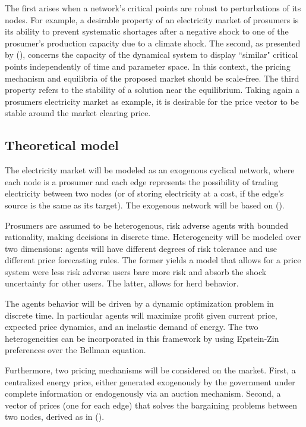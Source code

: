 \documentclass[american]{scrartcl}
\begin{document}
The first arises when a network's critical points are robust to perturbations of its nodes. For example, a desirable property of an electricity market of prosumers is its ability to prevent systematic shortages after a negative shock to one of the prosumer's production capacity due to a climate shock. The second, as presented by \citeauthor{Bak1995} (\citeyear{Bak1995}), concerns the capacity of the dynamical system to display ``similar" critical points independently of time and parameter space. In this context, the pricing mechanism and equilibria of the proposed market should be scale-free. The third property refers to the stability of a solution near the equilibrium. Taking again a prosumers electricity market as example, it is desirable for the price vector to be stable around the market clearing price.

\subsection{Theoretical model}

The electricity market will be modeled as an exogenous cyclical network, where each node is a prosumer and each edge represents the possibility of trading electricity between two nodes (or of storing electricity at a cost, if the edge's source is the same as its target). The exogenous network will be based on \citeauthor{Brown2019} (\citeyear{Brown2019}).

Prosumers are assumed to be heterogenous, risk adverse agents with bounded rationality, making decisions in discrete time. Heterogeneity will be modeled over two dimensions: agents will have different degrees of risk tolerance and use different price forecasting rules. The former yields a model that allows for a price system were less risk adverse users bare more risk and absorb the shock uncertainty for other users. The latter, allows for herd behavior. %

The agents behavior will be driven by a dynamic optimization problem in discrete time. In particular agents will maximize profit given current price, expected price dynamics, and an inelastic demand of energy. The two heterogeneities can be incorporated in this framework by using Epstein-Zin preferences over the Bellman equation.

Furthermore, two pricing mechanisms will be considered on the market. First, a centralized energy price, either generated exogenously by the government under complete information or endogenously via an auction mechanism. Second, a vector of prices (one for each edge) that solves the bargaining problems between two nodes, derived as in \citeauthor{Bedayo2016} (\citeyear{Bedayo2016}).
\end{document}
